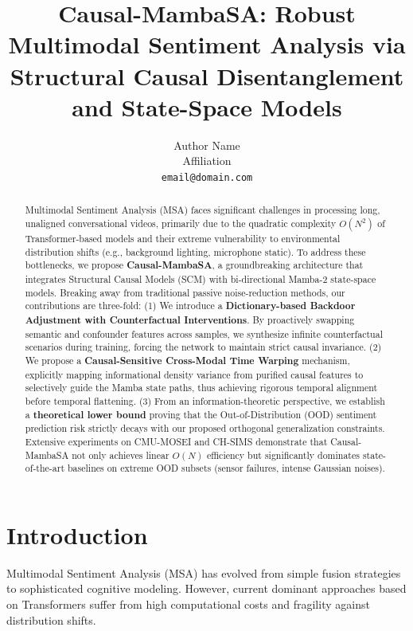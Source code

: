 \documentclass{article}
\title{Causal-MambaSA: Robust Multimodal Sentiment Analysis via Structural Causal Disentanglement and State-Space Models}
\author{
  Author Name \\
  Affiliation \\
  \texttt{email@domain.com} \\
}
\begin{document}
\maketitle

\begin{abstract}
Multimodal Sentiment Analysis (MSA) faces significant challenges in processing long, unaligned conversational videos, primarily due to the quadratic complexity $O(N^2)$ of Transformer-based models and their extreme vulnerability to environmental distribution shifts (e.g., background lighting, microphone static). To address these bottlenecks, we propose \textbf{Causal-MambaSA}, a groundbreaking architecture that integrates Structural Causal Models (SCM) with bi-directional Mamba-2 state-space models. Breaking away from traditional passive noise-reduction methods, our contributions are three-fold: (1) We introduce a \textbf{Dictionary-based Backdoor Adjustment with Counterfactual Interventions}. By proactively swapping semantic and confounder features across samples, we synthesize infinite counterfactual scenarios during training, forcing the network to maintain strict causal invariance. (2) We propose a \textbf{Causal-Sensitive Cross-Modal Time Warping} mechanism, explicitly mapping informational density variance from purified causal features to selectively guide the Mamba state paths, thus achieving rigorous temporal alignment before temporal flattening. (3) From an information-theoretic perspective, we establish a \textbf{theoretical lower bound} proving that the Out-of-Distribution (OOD) sentiment prediction risk strictly decays with our proposed orthogonal generalization constraints. Extensive experiments on CMU-MOSEI and CH-SIMS demonstrate that Causal-MambaSA not only achieves linear $O(N)$ efficiency but significantly dominates state-of-the-art baselines on extreme OOD subsets (sensor failures, intense Gaussian noises).
\end{abstract}

\section{Introduction}
Multimodal Sentiment Analysis (MSA) has evolved from simple fusion strategies to sophisticated cognitive modeling. However, current dominant approaches based on Transformers suffer from high computational costs and fragility against distribution shifts. 
\end{document}
